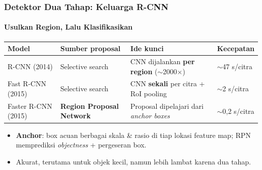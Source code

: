 \documentclass[t,aspectratio=169,xcolor=dvipsnames]{beamer}
\begin{document}
\begin{frame}
    \frametitle{Detektor Dua Tahap: Keluarga R-CNN}
    \framesubtitle{Usulkan Region, Lalu Klasifikasikan}
    \footnotesize

    \begin{center}
    \end{center}
    \vspace{-2pt}
    \begin{center}
    \scriptsize
    \begin{tabular}{llll}
        \toprule
        \textbf{Model} & \textbf{Sumber proposal} & \textbf{Ide kunci} & \textbf{Kecepatan} \\
        \midrule
        R-CNN (2014) & Selective search & CNN dijalankan \textbf{per region} ($\sim$2000$\times$) & $\sim$47 s/citra \\
        Fast R-CNN (2015) & Selective search & CNN \textbf{sekali} per citra + RoI pooling & $\sim$2 s/citra \\
        Faster R-CNN (2015) & \textbf{Region Proposal Network} & Proposal dipelajari dari \textit{anchor boxes} & $\sim$0,2 s/citra \\
        \bottomrule
    \end{tabular}
    \end{center}
    \vspace{0.1cm}
    \begin{itemize}
        \item \textbf{Anchor}: box acuan berbagai skala \& rasio di tiap lokasi feature map; RPN memprediksi \textit{objectness} + pergeseran box.
        \item Akurat, terutama untuk objek kecil, namun lebih lambat karena dua tahap.
    \end{itemize}
\end{frame}
\end{document}
